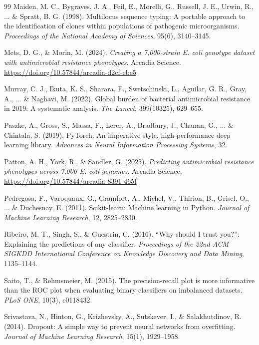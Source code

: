 \documentclass[11pt,a4paper]{article}
\begin{document}
\begin{thebibliography}{99}
Maiden, M. C., Bygraves, J. A., Feil, E., Morelli, G., Russell, J. E., Urwin, R., ... \& Spratt, B. G. (1998).
Multilocus sequence typing: A portable approach to the identification of clones within populations of pathogenic microorganisms.
\textit{Proceedings of the National Academy of Sciences}, 95(6), 3140--3145.

Mets, D. G., \& Morin, M. (2024).
\textit{Creating a 7,000-strain E. coli genotype dataset with antimicrobial resistance phenotypes}.
Arcadia Science.
\url{https://doi.org/10.57844/arcadia-d2cf-ebe5}

Murray, C. J., Ikuta, K. S., Sharara, F., Swetschinski, L., Aguilar, G. R., Gray, A., ... \& Naghavi, M. (2022).
Global burden of bacterial antimicrobial resistance in 2019: A systematic analysis.
\textit{The Lancet}, 399(10325), 629--655.

Paszke, A., Gross, S., Massa, F., Lerer, A., Bradbury, J., Chanan, G., ... \& Chintala, S. (2019).
PyTorch: An imperative style, high-performance deep learning library.
\textit{Advances in Neural Information Processing Systems}, 32.

Patton, A. H., York, R., \& Sandler, G. (2025).
\textit{Predicting antimicrobial resistance phenotypes across 7,000 E. coli genomes}.
Arcadia Science.
\url{https://doi.org/10.57844/arcadia-8391-465f}

Pedregosa, F., Varoquaux, G., Gramfort, A., Michel, V., Thirion, B., Grisel, O., ... \& Duchesnay, E. (2011).
Scikit-learn: Machine learning in Python.
\textit{Journal of Machine Learning Research}, 12, 2825--2830.

Ribeiro, M. T., Singh, S., \& Guestrin, C. (2016).
``Why should I trust you?'': Explaining the predictions of any classifier.
\textit{Proceedings of the 22nd ACM SIGKDD International Conference on Knowledge Discovery and Data Mining}, 1135--1144.

Saito, T., \& Rehmsmeier, M. (2015).
The precision-recall plot is more informative than the ROC plot when evaluating binary classifiers on imbalanced datasets.
\textit{PLoS ONE}, 10(3), e0118432.

Srivastava, N., Hinton, G., Krizhevsky, A., Sutskever, I., \& Salakhutdinov, R. (2014).
Dropout: A simple way to prevent neural networks from overfitting.
\textit{Journal of Machine Learning Research}, 15(1), 1929--1958.


\end{thebibliography}
\end{document}
